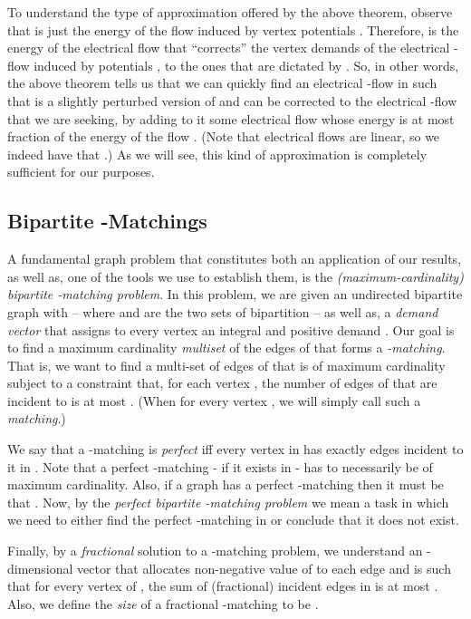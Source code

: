\documentclass[11pt, letterpaper]{article}
\begin{document}
To understand the type of approximation offered by the above theorem, observe that  is just the energy of the flow induced by vertex potentials . Therefore,  is the energy of the electrical flow  that ``corrects'' the vertex demands of the electrical -flow induced by potentials , to the ones that are dictated by . So, in other words, the above theorem tells us that we can quickly find an electrical -flow  in  such that  is a slightly perturbed version of  and  can be corrected to the electrical -flow  that we are seeking, by adding to it some electrical flow  whose energy is at most  fraction of the energy of the flow . (Note that electrical flows are linear, so we indeed have that .) As we will see, this kind of approximation is completely sufficient for our purposes. 

\subsection{Bipartite \texorpdfstring{-Matchings}{b-Matchings}}


A fundamental graph problem that constitutes both an application of our results, as well as, one of the tools we use to establish them, is the {\em (maximum-cardinality) bipartite -matching problem}. In this problem, we are given an undirected bipartite graph  with  -- where  and  are the two sets of bipartition -- as well as, a \emph{demand vector}  that assigns to every vertex  an integral and positive demand . Our goal is to find a maximum cardinality \emph{multiset}  of the edges of  that forms a {\em -matching}. That is, we want to find a multi-set  of edges of  that is of maximum cardinality subject to a constraint that, for each vertex , the number of edges of  that are incident to  is at most . (When  for every vertex , we will simply call such  a \emph{matching}.)

 We say that a -matching  is \emph{perfect} iff every vertex in  has exactly  edges incident to it in . Note that a perfect -matching - if it exists in  - has to necessarily be of maximum cardinality. Also, if a graph has a perfect -matching then it must be that . Now, by the {\em perfect bipartite -matching problem} we mean a task in which we need to either find the perfect -matching in  or conclude that it does not exist. 
 
 Finally, by a {\em fractional} solution to a -matching problem, we understand an -dimensional vector  that allocates non-negative value of  to each edge  and is such that for every vertex  of , the sum  of (fractional) incident edges in  is at most . Also, we define the {\em size} of a fractional -matching   to be .
\end{document}

